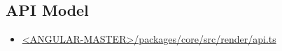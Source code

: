 \subsection{API Model}









\begin{itemize}
  \item \href{https://github.com/angular/angular/blob/master/packages/core/src/render/api.ts}
        {<ANGULAR-MASTER>/packages/core/src/render/api.ts}
\end{itemize}









